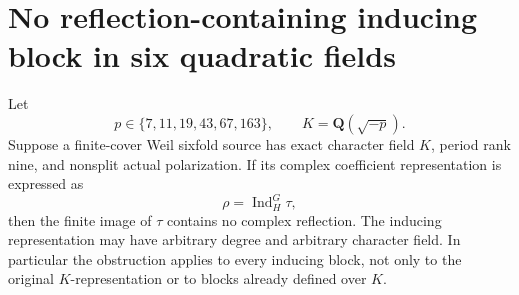 \section{No reflection-containing inducing block in six quadratic fields}
\label{sec:large-prime-inducing}

\begin{theorem}
\label{D-BI-13}
Let
\[
 p\in\{7,11,19,43,67,163\},\qquad K=\mathbf Q(\sqrt{-p}).
\]
Suppose a finite-cover Weil sixfold source has exact character field
$K$, period rank nine, and nonsplit actual polarization.  If its
complex coefficient representation is expressed as
\[
                       \rho=\operatorname{Ind}_H^G\tau,
\]
then the finite image of $\tau$ contains no complex reflection.
The inducing representation may have arbitrary degree and arbitrary
character field.  In particular the obstruction applies to every
inducing block, not only to the original $K$-representation or to
blocks already defined over $K$.
\end{theorem}
